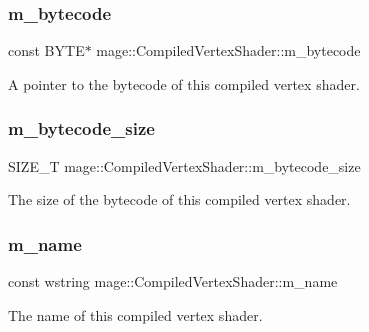 \subsubsection{\texorpdfstring{m\+\_\+bytecode}{m\_bytecode}}
{\footnotesize\ttfamily const B\+Y\+TE$\ast$ mage\+::\+Compiled\+Vertex\+Shader\+::m\+\_\+bytecode}

A pointer to the bytecode of this compiled vertex shader. \hypertarget{structmage_1_1_compiled_vertex_shader_ad0f3b47bc42daed6377cfff63cf2f808}{}\label{structmage_1_1_compiled_vertex_shader_ad0f3b47bc42daed6377cfff63cf2f808} 
\subsubsection{\texorpdfstring{m\+\_\+bytecode\+\_\+size}{m\_bytecode\_size}}
{\footnotesize\ttfamily S\+I\+Z\+E\+\_\+T mage\+::\+Compiled\+Vertex\+Shader\+::m\+\_\+bytecode\+\_\+size}

The size of the bytecode of this compiled vertex shader. \hypertarget{structmage_1_1_compiled_vertex_shader_af37c5f63c4146dd796c7e4df5ade4d0e}{}\label{structmage_1_1_compiled_vertex_shader_af37c5f63c4146dd796c7e4df5ade4d0e} 
\subsubsection{\texorpdfstring{m\+\_\+name}{m\_name}}
{\footnotesize\ttfamily const wstring mage\+::\+Compiled\+Vertex\+Shader\+::m\+\_\+name}

The name of this compiled vertex shader. 